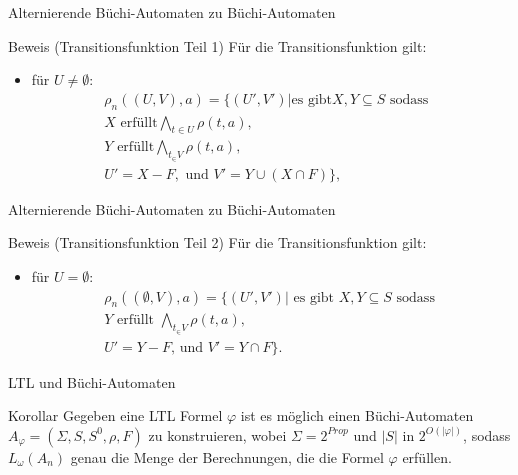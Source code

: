 \begin{frame}{Alternierende Büchi-Automaten zu Büchi-Automaten}
\begin{block}{Beweis (Transitionsfunktion Teil 1)}
Für die Transitionsfunktion gilt:
\begin{itemize}
\item für $U\neq\emptyset$:
\begin{align*}
\rho_n((U,V),a)=\{(U',V')| \text{es gibt} X,Y\subseteq S\text{ sodass}&\\
X \text{ erfüllt} \bigwedge_{t \in U}\rho(t,a),\\
Y \text{ erfüllt} \bigwedge_{t_\in V}\rho(t,a),\\
U'=X-F, \text{ und } V'=Y\cup(X\cap F)\},
\end{align*}
\end{itemize}
\end{block}
\end{frame}

\begin{frame}{Alternierende Büchi-Automaten zu Büchi-Automaten}
\begin{block}{Beweis (Transitionsfunktion Teil 2)}
Für die Transitionsfunktion gilt:
\begin{itemize}
\item für $U=\emptyset$:
\begin{align*}
\rho_n((\emptyset,V),a)=\{(U',V')|\text{ es gibt } X,Y\subseteq S \text{ sodass }\\
Y \text{ erfüllt } \bigwedge_{t_\in V}\rho(t,a),\\
U'=Y-F\text{, und } V'=Y\cap F\}.
\end{align*}
\end{itemize}
\end{block}
\end{frame}

\begin{frame}{LTL und Büchi-Automaten}
\begin{block}{Korollar \cite{vardi+96,vardi+94}}
Gegeben eine LTL Formel $\varphi$ ist es möglich einen Büchi-Automaten $A_{\varphi}=(\Sigma,S, S^0,\rho,F)$ zu konstruieren, wobei $\Sigma=2^{Prop}$ und $|S|$ in $2^{O(|\varphi|)}$, sodass $L_{\omega}(A_n)$ genau die Menge der Berechnungen, die die Formel $\varphi$ erfüllen.
\end{block}
\end{frame}